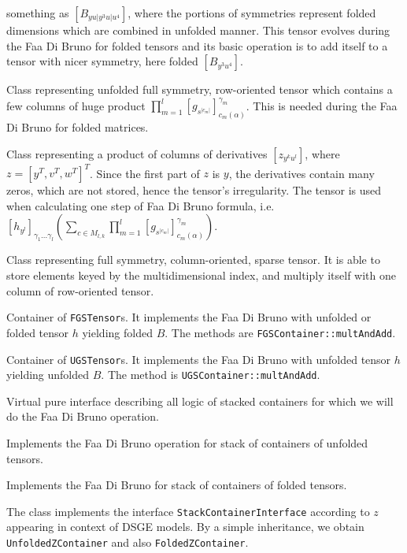 \documentclass[11pt,a4paper]{article}
\begin{document}
\begin{description}
something as $\left[B_{yu\vert y^3u\vert u^4}\right]$, where the
portions of symmetries represent folded dimensions which are combined
in unfolded manner. This tensor evolves during the Faa Di Bruno
for folded tensors and its basic operation is to add itself to a
tensor with nicer symmetry, here folded $\left[B_{y^3u^4}\right]$.
\item[USubTensor]
Class representing unfolded full symmetry, row-oriented tensor which
contains a few columns of huge product
$\prod_{m=1}^l\left[g_{s^{\vert c_m\vert}}\right]^{\gamma_m}_{c_m(\alpha)}$. This is
needed during the Faa Di Bruno for folded matrices.
\item[IrregTensor]
Class representing a product of columns of derivatives
$\left[z_{y^ku^l}\right]$, where $z=[y^T,v^T,w^T]^T$. Since the first
part of $z$ is $y$, the derivatives contain many zeros, which are not
stored, hence the tensor's irregularity. The tensor is used when
calculating one step of Faa Di Bruno formula, i.e.
$\left[h_{y^l}\right]_{\gamma_1\ldots\gamma_l}
\left(\sum_{c\in M_{l,k}}
\prod_{m=1}^l\left[g_{s^{\vert c_m\vert}}\right]^{\gamma_m}_{c_m(\alpha)}\right)$.
\item[FSSparseTensor]
Class representing full symmetry, column-oriented, sparse tensor. It
is able to store elements keyed by the multidimensional index, and
multiply itself with one column of row-oriented tensor.
\item[FGSContainer]
Container of \texttt{FGSTensor}s. It implements the Faa Di Bruno with
unfolded or folded tensor $h$ yielding folded $B$. The methods are
\texttt{FGSContainer::multAndAdd}.
\item[UGSContainer]
Container of \texttt{UGSTensor}s. It implements the Faa Di Bruno with
unfolded tensor $h$ yielding unfolded $B$. The method is
\texttt{UGSContainer::multAndAdd}.
\item[StackContainerInterface]
Virtual pure interface describing all logic
of stacked containers for which we will do the Faa Di Bruno operation.
\item[UnfoldedStackContainer]
Implements the Faa Di Bruno operation for stack of
containers of unfolded tensors.
\item[FoldedStackContainer]
Implements the Faa Di Bruno for stack of
containers of folded tensors.
\item[ZContainer]
The class implements the interface \texttt{StackContainerInterface} according
to $z$ appearing in context of DSGE models. By a simple inheritance,
we obtain \texttt{UnfoldedZContainer} and also \texttt{FoldedZContainer}.

\end{description}
\end{document}
